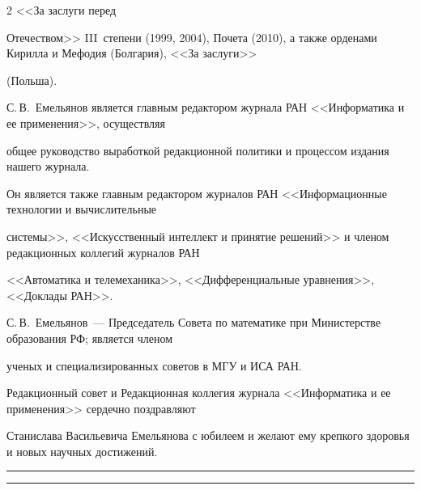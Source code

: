 \begin{multicols}{2}
<<За заслуги перед

Отечеством>> III~степени (1999, 2004), Почета (2010), а также орденами Кирилла и Мефодия (Болгария), <<За заслуги>>

(Польша).



     С.\,В.~Емельянов является главным редактором журнала РАН <<Информатика и ее применения>>, осуществляя

общее руководство выработкой редакционной политики и процессом издания нашего журнала.



     Он является также главным редактором журналов РАН <<Информационные технологии и вы\-чис\-ли\-тель\-ные

системы>>, <<Искусственный интеллект и принятие решений>> и членом редакционных коллегий журналов РАН

<<Автоматика и телемеханика>>, <<Дифференциальные уравнения>>, <<Доклады РАН>>.



     С.\,В.~Емельянов~--- Председатель Совета по математике при Министерстве образования РФ; является членом

ученых и специализированных советов в МГУ и ИСА РАН.



     \bigskip



     Редакционный совет и Редакционная коллегия журнала <<Информатика и ее применения>> сердечно поздравляют

Станислава Васильевича Емельянова с юбилеем и желают ему крепкого здоровья и новых научных достижений.










\end{multicols}



\hrule



\vspace*{2pt}



\hrule



\vspace*{24pt}





